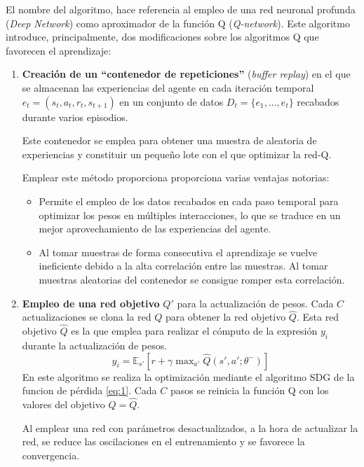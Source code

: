 El nombre del algoritmo, hace referencia al empleo de una red neuronal profunda (\textit{Deep Network}) como aproximador de la función Q (\textit{Q-network}).
Este algoritmo introduce, principalmente, dos modificaciones sobre los algoritmos Q que favorecen el aprendizaje:

\begin{enumerate}
	\item \textbf{Creación de un ``contenedor de repeticiones''} (\textit{buffer replay}) en el que se almacenan las experiencias del agente en cada iteración temporal $e_t=(s_t,a_t,r_t,s_{t+1})$ en un conjunto de datos $D_t=\{e_1,...,e_t\}$ recabados durante varios episodios.
	
	Este contenedor se emplea para obtener una muestra de aleatoria de experiencias y constituir un pequeño lote con el que optimizar la red-Q.
	
	Emplear este método proporciona proporciona varias ventajas notorias:
	
	\begin{itemize}
		\item Permite el empleo de los datos recabados en cada paso temporal para optimizar los pesos en múltiples interacciones, lo que se traduce en un mejor aprovechamiento de las experiencias del agente.
		
		\item Al tomar muestras de forma consecutiva el aprendizaje se vuelve ineficiente debido a la alta correlación entre las muestras. Al tomar muestras aleatorias del contenedor se consigue romper esta correlación.
	\end{itemize}
	
	\item \textbf{Empleo de una red objetivo }$Q'$ para la actualización de pesos.  Cada $C$ actualizaciones se clona la red $Q$ para obtener la red objetivo $\hat Q$. Esta red objetivo $\hat Q$ es la que emplea para realizar el cómputo de la expresión $y_i$ durante la actualización de pesos.
	\begin{equation}
	y_i= \mathbb{E}_{s'}[ r + \gamma \; {\text{max}_{a'}} \; \hat Q(s',a';\theta^-)]
	\end{equation}
	En este algoritmo se realiza la optimización mediante el algoritmo SDG de la funcion de pérdida \ref{eq:1}.  Cada $C$ pasos se reinicia la función Q con los valores del objetivo $Q=\hat Q$.
	
	Al emplear una red con parámetros desactualizados, a la hora de actualizar la red, se  reduce las oscilaciones en el entrenamiento y se favorece la convergencia.
	
\end{enumerate}

